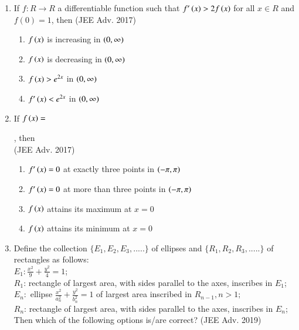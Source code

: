 \documentclass[journal,12pt,twocolumn]{IEEEtran}
\theoremstyle{remark}
\begin{document}
\begin{enumerate}
{        }
    \item{
        
            If $f: R\rightarrow R$ a differentiable function such that $f'\left(x\right)>2f\left(x\right)$ for all $x \in R$ and $f(0) = 1$, then
             \text{   }\hfill
                {(JEE Adv. 2017)}
            
            \begin{enumerate}
                \item $f\left(x\right)$ is increasing in $\left(0,\infty\right)$
                \item $f\left(x\right)$ is decreasing in $\left(0,\infty\right)$
                \item $f\left(x\right)>e^{2x}$ in $\left(0,\infty\right)$
                \item $f'\left(x\right)<e^{2x}$ in $\left(0,\infty\right)$
            \end{enumerate}
        
        }
    \item{
        
            If $f\left(x\right) = $
            
            , then \\
            \text{   } \hfill
                {(JEE Adv. 2017)}
            
            \begin{enumerate}
                \item $f'\left(x\right) = 0$ at exactly three points in $\left(-\pi,\pi\right)$
                \item $f'\left(x\right) = 0$ at more than three points in $\left(-\pi,\pi\right)$
                \item $f\left(x\right)$ attains its maximum at $x=0$
                \item $f\left(x\right)$ attains its minimum at $x=0$
            \end{enumerate}
        
        }
    \item{
        
            Define the collection $\{E_1, E_2, E_3, .....\}$ of ellipses and $\{R_1, R_2, R_3, .....\}$ of rectangles as follows:\\[6pt]
            $E_1 : \frac{x^2}{9}+ \frac{y^2}{4} = 1$;\\[6pt]
            $R_1$: rectangle of largest area, with sides parallel to the axes, inscribes in $E_1$;\\[6pt]
            $E_n : $ ellipse $\frac{x^2}{a_n^2}+ \frac{y^2}{b_n^2} = 1$ of largest area inscribed in $R_{n-1}, n>1;$\\[6pt]
            $R_n$: rectangle of largest area, with sides parallel to the axes, inscribes in $E_n$;\\ Then which of the following options is/are correct?
             \hfill
                {(JEE Adv. 2019)}
            
}
\end{enumerate}
\end{document}

